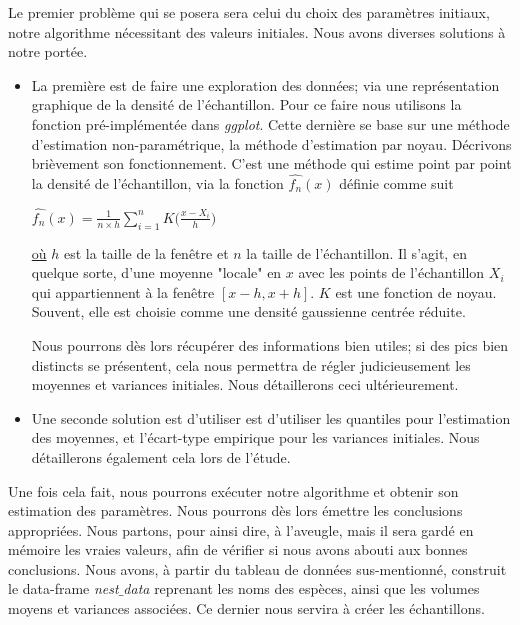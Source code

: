 \documentclass[frenchb]{report}
\newcommand{\1}{\mathbbm{1}}
\theoremstyle{definition}\newtheorem{defn}{Définition}
\theoremstyle{definition}\newtheorem{exm}{Exemple}
\theoremstyle{definition}\newtheorem{nota}{Notation}
\theoremstyle{definition}\newtheorem{rem}{Remarque}
\begin{document}
Le premier problème qui se posera sera celui du choix des paramètres initiaux, notre algorithme nécessitant des valeurs initiales. Nous avons diverses solutions à notre portée.
\begin{itemize}[label=\adfflowerleft]
\item La première est de faire une exploration des données; via une représentation graphique de la densité de l'échantillon. Pour ce faire nous utilisons la fonction pré-implémentée dans \textit{ggplot}. Cette dernière se base sur une méthode d'estimation non-paramétrique, la méthode d'estimation par noyau. Décrivons brièvement son fonctionnement. C'est une méthode qui estime point par point la densité de l'échantillon, via la fonction $\widehat{f_n}(x)$ définie comme suit

\begin{center}
$
\widehat{f_n}(x) = \displaystyle \frac{1}{n\times h} \sum_{i=1}^n K\Big(\frac{x - X_i}{h}\Big)
$
\end{center}
\underline{où} $h$ est la taille de la fenêtre et $n$ la taille de l'échantillon. Il s'agit, en quelque sorte, d'une moyenne "locale" en $x$ avec les points de l'échantillon $X_i$ qui appartiennent à la fenêtre $[x-h, x+h]$. $K$ est une fonction de noyau. Souvent, elle est choisie comme une densité gaussienne centrée réduite.

Nous pourrons dès lors récupérer des informations bien utiles; si des pics bien distincts se présentent, cela nous permettra de régler judicieusement les moyennes et variances initiales. Nous détaillerons ceci ultérieurement. \newline
\item Une seconde solution est d'utiliser est d'utiliser les quantiles pour l'estimation des moyennes, et l'écart-type empirique pour les variances initiales. Nous détaillerons également cela lors de l'étude.
\end{itemize}

Une fois cela fait, nous pourrons exécuter notre algorithme et obtenir son estimation des paramètres. Nous pourrons dès lors émettre les conclusions appropriées.\newline
Nous partons, pour ainsi dire, à l'aveugle, mais il sera gardé en mémoire les vraies valeurs, afin de vérifier si nous avons abouti aux bonnes conclusions. \newline
Nous avons, à partir du tableau de données sus-mentionné, construit le data-frame \textit{nest$\_$data} reprenant les noms des espèces, ainsi que les volumes moyens et variances associées. Ce dernier nous servira à créer les échantillons.
\newpage
\end{document}
